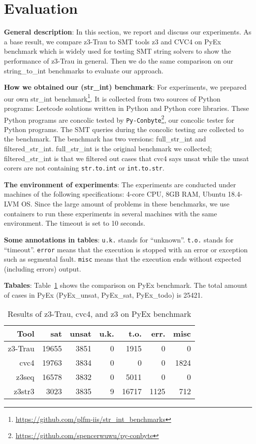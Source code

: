 \section{Evaluation}
\label{section:evaluation}


{\bf General description}:
In this section, we report and discuss our experiments. As a base result, we compare z3-Trau to SMT tools z3 and CVC4 on PyEx benchmark which is widely used for testing SMT string solvers to show the performance of z3-Trau in general. Then we do the same comparison on our string\_to\_int benchmarks to evaluate our approach.

{\bf How we obtained our (str\_int) benchmark}:
For experiments, we prepared our own str\_int benchmark\footnote{\url{https://github.com/plfm-iis/str_int_benchmarks}}. It is collected from two sources of Python programs: Leetcode solutions written in Python and Python core libraries. These Python programs are concolic tested by \texttt{Py-Conbyte}\footnote{\url{https://github.com/spencerwuwu/py-conbyte}}, our concolic tester for Python programs. The SMT queries during the concolic testing are collected to the benchmark. The benchmark has two versions: full\_str\_int and filtered\_str\_int. full\_str\_int is the original benchmark we collected; filtered\_str\_int is that we filtered out cases that cvc4 says unsat while the unsat corers are not containing \texttt{str.to.int} or \texttt{int.to.str}. 

{\bf The environment of experiments}:
The experiments are conducted under machines of the following specifications: 4-core CPU, 8GB RAM, Ubuntu 18.4-LVM OS. Since the large amount of problems in these benchmarks, we use containers to run these experiments in several machines with the same environment. The timeout is set to 10 seconds.

{\bf Some annotations in tables}:
\texttt{u.k.} stands for ``unknown''. \texttt{t.o.} stands for ``timeout''. \texttt{error} means that the execution is stopped with an error or exception such as segmental fault. \texttt{misc} means that the execution ends without expected (including errors) output.

{\bf Tabales}:
Table~\ref{table:pyex} shows the comparison on PyEx benchmark. The total amount of cases in PyEx (PyEx\_unsat, PyEx\_sat, PyEx\_todo) is 25421.

\begin{table}[]
\caption{Results of z3-Trau, cvc4, and z3 on PyEx benchmark}
\begin{tabular}{|r|r|r|r|r|r|r|}
\hline
Tool		& sat & unsat & u.k. & t.o. & err. & misc \\ \hline\hline
z3-Trau		& 19655 & 3851 & 0 & 1915 & 0 & 0 \\ 
cvc4		& 19763 & 3834 & 0 & 0 & 0 & 1824 \\ 
z3seq		& 16578 & 3832 & 0 & 5011 & 0 & 0 \\ 
z3str3		& 3023 & 3835 & 9 & 16717 & 1125 & 712 \\ \hline
\end{tabular}
\label{table:pyex}
\end{table}

